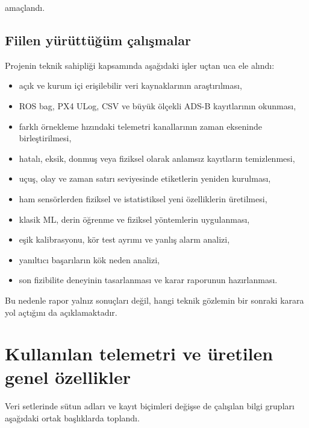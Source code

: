 \documentclass[11pt,a4paper]{article}
\begin{document}
amaçlandı.

\subsection{Fiilen yürüttüğüm çalışmalar}

Projenin teknik sahipliği kapsamında aşağıdaki işler uçtan uca ele alındı:

\begin{itemize}
  \item açık ve kurum içi erişilebilir veri kaynaklarının araştırılması,
  \item ROS bag, PX4 ULog, CSV ve büyük ölçekli ADS-B kayıtlarının okunması,
  \item farklı örnekleme hızındaki telemetri kanallarının zaman ekseninde birleştirilmesi,
  \item hatalı, eksik, donmuş veya fiziksel olarak anlamsız kayıtların temizlenmesi,
  \item uçuş, olay ve zaman satırı seviyesinde etiketlerin yeniden kurulması,
  \item ham sensörlerden fiziksel ve istatistiksel yeni özelliklerin üretilmesi,
  \item klasik ML, derin öğrenme ve fiziksel yöntemlerin uygulanması,
  \item eşik kalibrasyonu, kör test ayrımı ve yanlış alarm analizi,
  \item yanıltıcı başarıların kök neden analizi,
  \item son fizibilite deneyinin tasarlanması ve karar raporunun hazırlanması.
\end{itemize}

Bu nedenle rapor yalnız sonuçları değil, hangi teknik gözlemin bir sonraki
karara yol açtığını da açıklamaktadır.

\section{Kullanılan telemetri ve üretilen genel özellikler}

Veri setlerinde sütun adları ve kayıt biçimleri değişse de çalışılan bilgi
grupları aşağıdaki ortak başlıklarda toplandı.
\end{document}
